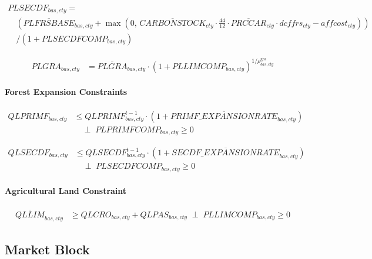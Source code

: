 \begin{multline}
  PLSECDF_{bas,cty}
  =
  \\[-0.3em]
  \quad 
  \left(
    \overline{PLFRSBASE}_{bas,cty}
    + \max\!\left(
        0,\,
        \overline{CARBONSTOCK}_{cty}
        \cdot \frac{44}{12}
        \cdot \overline{PRCCAR}_{cty}
        \cdot dcffrs_{cty}
        - affcost_{cty}
      \right)
  \right)
  \\[-0.3em]
  \quad / (1 + PLSECDFCOMP_{bas,cty})
  \tag{PLSECDFEQ}\label{eq:PLSECDFEQ}
\end{multline}

\begin{align}
  PLGRA_{bas,cty}
  &=
  \overline{PLGRA}_{bas,cty}
  \cdot
  (1+PLLIMCOMP_{bas,cty})^{1/\rho^{\text{gra}}_{bas,cty}}
  \tag{PLGRAEQ}\label{eq:PLGRAEQ}
\end{align}

\paragraph{Forest Expansion Constraints}
\begin{align}
  QLPRIMF_{bas,cty}
  &\le
  QLPRIMF^{t-1}_{bas,cty}
  \cdot
  (1+\overline{PRIMF\_EXPANSIONRATE}_{bas,cty})
  \nonumber\\[-0.3em]
  &\quad \perp\;
  PLPRIMFCOMP_{bas,cty}\ge 0
  \tag{QLPRIMFLIMEQ}\label{eq:QLPRIMFLIMEQ}
\end{align}

\begin{align}
  QLSECDF_{bas,cty}
  &\le
  QLSECDF^{t-1}_{bas,cty}
  \cdot
  (1+\overline{SECDF\_EXPANSIONRATE}_{bas,cty})
  \nonumber\\[-0.3em]
  &\quad \perp\;
  PLSECDFCOMP_{bas,cty}\ge 0
  \tag{QLSECDFLIMEQ}\label{eq:QLSECDFLIMEQ}
\end{align}

\paragraph{Agricultural Land Constraint}
\begin{align}
  \overline{QLLIM}_{bas,cty}
  &\ge
  QLCRO_{bas,cty} + QLPAS_{bas,cty}
  \;\perp\;
  PLLIMCOMP_{bas,cty} \ge 0
  \tag{QLLIMEQ}\label{eq:QLLIMEQ}
\end{align}


\subsection{Market Block}

